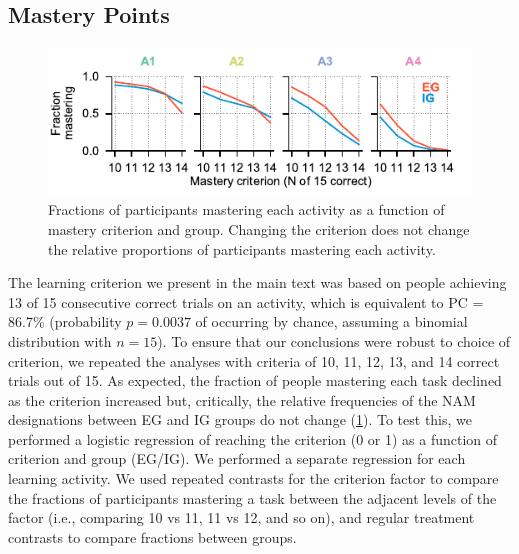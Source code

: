 \begin{subappendices}
\section{Mastery Points}\label{CH4A_S_mastery_points} 

\begin{figure}[tbh]
    \centering
    \includegraphics[width=.75\columnwidth]{Figures/c4/fig_s3.pdf}
    \caption[short Appendix figure description]{Fractions of participants mastering each activity as a function of mastery criterion and group. Changing the criterion does not change the relative proportions of participants mastering each activity.}
    \label{fig:CH4A_3_mastery_points}
\end{figure}


The learning criterion we present in the main text was based on people achieving 13 of 15 consecutive correct trials on an activity, which is equivalent to \ac{PC} = 86.7\% (probability $p = 0.0037$ of occurring by chance, assuming a binomial distribution with $n=15$). To ensure that our conclusions were robust to choice of criterion, we repeated the analyses with criteria of 10, 11, 12, 13, and 14 correct trials out of 15. As expected, the fraction of people mastering each task declined as the criterion increased but, critically, the relative frequencies of the NAM designations between \ac{EG} and \ac{IG} groups do not change (\cref{fig:CH4A_3_mastery_points}). To test this, we performed a logistic regression of reaching the criterion (0 or 1) as a function of criterion and group (\ac{EG}/\ac{IG}). We performed a separate regression for each learning activity. We used repeated contrasts for the criterion factor to compare the fractions of participants mastering a task between the adjacent levels of the factor (i.e., comparing 10 vs 11, 11 vs 12, and so on), and regular treatment contrasts to compare fractions between groups. 


\end{subappendices}
